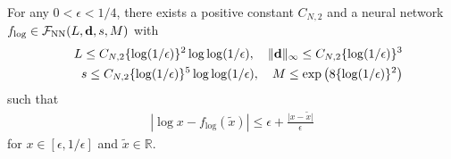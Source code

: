 \documentclass[twoside,11pt]{article}
\def\cF{\mathcal F}
\newcommand{\bd}{{\bf d}}
\newcommand{\bbR}{{\mathbb R}}
\newcommand{\bean}{\setlength\arraycolsep{1pt}\begin{eqnarray*}}
\newcommand{\eean}{\end{eqnarray*}}
\begin{document}

\begin{lemma}
\label{secnn:log}
For any $0 < \epsilon < 1/4$, there exists a positive constant $C_{N,2}$ and a neural network $f_{\log} \in \cF_{\rm NN}(L,\bd,s,M)$ with
\bean
&& L \leq C_{N,2} \{ \log(1/\epsilon)\}^{2} \log \log (1/\epsilon), \quad \|\bd\|_{\infty}\leq C_{N,2}  \{ \log(1/\epsilon)\}^{3}
\\
&& s  \leq C_{N,2}  \{ \log(1/\epsilon)\}^{5} \log \log (1/\epsilon), \quad M \leq \exp \left( 8 \{\log (1/\epsilon) \}^{2} \right)
\eean
such that
\bean
\left\vert \log x - f_{\log}(\widetilde x) \right\vert \leq \epsilon + \frac{\vert x - \widetilde x\vert}{\epsilon}
\eean
for $x \in [\epsilon,1/\epsilon]$ and $\widetilde x \in \bbR$.
\end{lemma}
\end{document}
